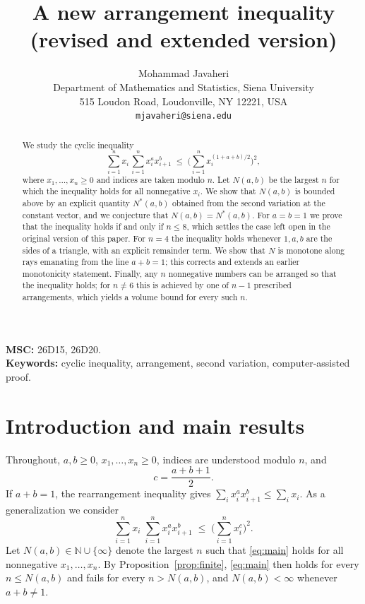\documentclass[11pt]{article}
\title{A new arrangement inequality\\[2pt]\large (revised and extended version)}
\author{Mohammad Javaheri\\
Department of Mathematics and Statistics, Siena University \\
515 Loudon Road, Loudonville, NY 12221, USA\\
\texttt{mjavaheri@siena.edu}}
\theoremstyle{remark}
\numberwithin{equation}{section}
\newcommand{\N}{\mathbb{N}}
\begin{document}
\maketitle

\begin{abstract}
We study the cyclic inequality
\[
\sum_{i=1}^n x_i\,\sum_{i=1}^n x_i^a x_{i+1}^b\;\le\;\Big(\sum_{i=1}^n x_i^{(1+a+b)/2}\Big)^2,
\]
where $x_1,\dots,x_n\ge 0$ and indices are taken modulo $n$. Let $N(a,b)$ be the largest $n$ for which the inequality holds
for all nonnegative $x_i$. We show that $N(a,b)$ is bounded above by an explicit quantity
$N^*(a,b)$ obtained from the second variation at the constant vector, and we conjecture that
$N(a,b)=N^*(a,b)$. For $a=b=1$ we prove that the inequality holds if and only if $n\le 8$, which
settles the case left open in the original version of this paper. For $n=4$ the inequality holds
whenever $1,a,b$ are the sides of a triangle, with an explicit remainder term. We show that $N$ is
monotone along rays emanating from the line $a+b=1$; this corrects and extends an earlier
monotonicity statement. Finally, any $n$ nonnegative numbers can be arranged so that the
inequality holds; for $n\neq 6$ this is achieved by one of $n-1$ prescribed arrangements, which
yields a volume bound for every such $n$.
\end{abstract}

\noindent\textbf{MSC:} 26D15, 26D20. \\ \textbf{Keywords:} cyclic inequality, arrangement,
second variation, computer-assisted proof.

\section{Introduction and main results}

Throughout, $a,b\ge 0$, $x_1,\dots,x_n\ge 0$, indices are understood modulo $n$, and
\[
c=\frac{a+b+1}{2}.
\]
If $a+b=1$, the rearrangement inequality \cite{HLP} gives
$\sum_{i} x_i^a x_{i+1}^b\le \sum_i x_i$. As a generalization we consider
\begin{equation}\label{eq:main}
\sum_{i=1}^n x_i\;\sum_{i=1}^n x_i^a x_{i+1}^b\;\le\;\Big(\sum_{i=1}^n x_i^{c}\Big)^2 .
\end{equation}
Let $N(a,b)\in\N\cup\{\infty\}$ denote the largest $n$ such that \eqref{eq:main} holds for all
nonnegative $x_1,\dots,x_n$. By Proposition~\ref{prop:finite}, \eqref{eq:main} then holds for
every $n\le N(a,b)$ and fails for every $n>N(a,b)$, and $N(a,b)<\infty$ whenever $a+b\ne 1$.
\end{document}

